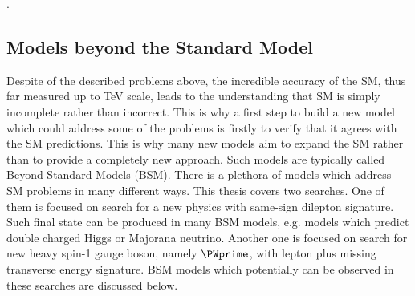 
.


\subsection{Models beyond the Standard Model}
\label{subsec:bsm_models}
Despite of the described problems above, the incredible accuracy of the SM, thus far measured up to TeV scale, leads to the understanding that SM 
is simply incomplete rather than incorrect. 
This is why a first step to build a new model which could address some of the problems is firstly to verify that it agrees with the SM predictions. 
This is why many new models aim to expand the SM rather than to provide a completely new approach. Such models are typically called Beyond Standard Models (BSM).
There is a plethora of models which address SM problems in many different ways. 
This thesis covers two searches. One of them is focused on search for a new physics with same-sign dilepton signature. Such final state can be produced in many BSM models, e.g. models which predict double charged Higgs or Majorana neutrino. Another one is focused on search for new heavy spin-1 gauge boson, namely $\PWprime$, with lepton plus missing transverse energy signature. BSM models which potentially can be observed in these searches are discussed below.

